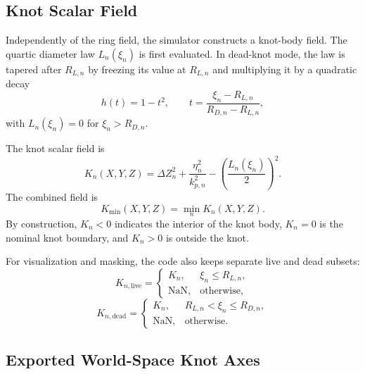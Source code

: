 \documentclass[11pt]{article}
\begin{document}
\subsection{Knot Scalar Field}

Independently of the ring field, the simulator constructs a knot-body field. The quartic diameter law
$L_n(\xi_n)$ is first evaluated. In dead-knot mode, the law is tapered after $R_{L,n}$ by freezing its value at
$R_{L,n}$ and multiplying it by a quadratic decay
\begin{equation}
h(t) = 1 - t^2,
\qquad
t = \frac{\xi_n - R_{L,n}}{R_{D,n} - R_{L,n}},
\end{equation}
with $L_n(\xi_n)=0$ for $\xi_n > R_{D,n}$.

The knot scalar field is
\begin{equation}
K_n(X,Y,Z)
=
\Delta Z_n^2 + \frac{\eta_n^2}{k_{p,n}^2}
- \left(\frac{L_n(\xi_n)}{2}\right)^2.
\end{equation}
The combined field is
\begin{equation}
K_{\min}(X,Y,Z) = \min_n K_n(X,Y,Z).
\end{equation}
By construction, $K_n < 0$ indicates the interior of the knot body, $K_n = 0$ is the nominal knot boundary,
and $K_n > 0$ is outside the knot.

For visualization and masking, the code also keeps separate live and dead subsets:
\begin{equation}
K_{n,\mathrm{live}} =
\begin{cases}
K_n, & \xi_n \le R_{L,n}, \\
\mathrm{NaN}, & \text{otherwise},
\end{cases}
\end{equation}
\begin{equation}
K_{n,\mathrm{dead}} =
\begin{cases}
K_n, & R_{L,n} < \xi_n \le R_{D,n}, \\
\mathrm{NaN}, & \text{otherwise}.
\end{cases}
\end{equation}

\subsection{Exported World-Space Knot Axes}
\end{document}
